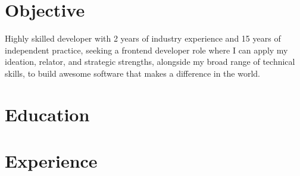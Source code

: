 \documentclass[11pt, a4paper]{article}
\begin{document}


\section*{Objective}
\vspace{-0.05in}
\hspace*{0.04in}
\begin{minipage}{0.97\textwidth}
  Highly skilled developer with 2 years of industry experience and 15 years of
  independent practice, seeking a frontend developer role where I can apply my
  ideation, relator, and strategic strengths, alongside my broad range of technical
  skills, to build awesome software that makes a difference in the world.
\end{minipage}
\vspace{-0.15in}

\section*{Education}
\vspace{-0.05in}

\noindent
{
  \hfill
}

\noindent
{
  \hfill
}

\noindent
{
  \hfill
}
\vspace{-0.15in}

\section*{Experience}
\vspace{-0.05in}


\noindent
{
  \hfill
}
\end{document}
